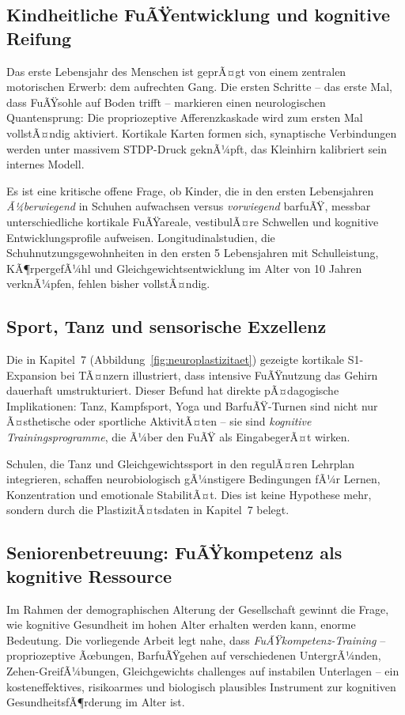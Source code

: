 ﻿\documentclass[12pt,a4paper]{report}
\theoremstyle{plain}
\theoremstyle{definition}
\theoremstyle{remark}
\begin{document}
\subsection{Kindheitliche FuÃŸentwicklung und kognitive Reifung}

Das erste Lebensjahr des Menschen ist geprÃ¤gt von einem
zentralen motorischen Erwerb: dem aufrechten Gang. Die ersten
Schritte -- das erste Mal, dass FuÃŸsohle auf Boden trifft --
markieren einen neurologischen Quantensprung: Die propriozeptive
Afferenzkaskade wird zum ersten Mal vollstÃ¤ndig aktiviert.
Kortikale Karten formen sich, synaptische Verbindungen werden
unter massivem STDP-Druck geknÃ¼pft, das Kleinhirn kalibriert
sein internes Modell.

Es ist eine kritische offene Frage, ob Kinder, die in den ersten
Lebensjahren \emph{Ã¼berwiegend} in Schuhen aufwachsen versus
\emph{vorwiegend} barfuÃŸ, messbar unterschiedliche kortikale
FuÃŸareale, vestibulÃ¤re Schwellen und kognitive Entwicklungsprofile
aufweisen. Longitudinalstudien, die Schuhnutzungsgewohnheiten
in den ersten 5 Lebensjahren mit Schulleistung, KÃ¶rpergefÃ¼hl und
Gleichgewichtsentwicklung im Alter von 10 Jahren verknÃ¼pfen,
fehlen bisher vollstÃ¤ndig.

\subsection{Sport, Tanz und sensorische Exzellenz}

Die in Kapitel~7 (Abbildung~\ref{fig:neuroplastizitaet}) gezeigte
kortikale S1-Expansion bei TÃ¤nzern illustriert, dass intensive
FuÃŸnutzung das Gehirn dauerhaft umstrukturiert. Dieser Befund hat
direkte pÃ¤dagogische Implikationen: Tanz, Kampfsport, Yoga und
BarfuÃŸ-Turnen sind nicht nur Ã¤sthetische oder sportliche
AktivitÃ¤ten -- sie sind \emph{kognitive Trainingsprogramme},
die Ã¼ber den FuÃŸ als EingabegerÃ¤t wirken.

Schulen, die Tanz und Gleichgewichtssport in den regulÃ¤ren
Lehrplan integrieren, schaffen neurobiologisch gÃ¼nstigere
Bedingungen fÃ¼r Lernen, Konzentration und emotionale StabilitÃ¤t.
Dies ist keine Hypothese mehr, sondern durch die PlastizitÃ¤tsdaten
in Kapitel~7 belegt.

\subsection{Seniorenbetreuung: FuÃŸkompetenz als kognitive Ressource}

Im Rahmen der demographischen Alterung der Gesellschaft gewinnt
die Frage, wie kognitive Gesundheit im hohen Alter erhalten werden
kann, enorme Bedeutung. Die vorliegende Arbeit legt nahe, dass
\emph{FuÃŸkompetenz-Training} -- propriozeptive Ãœbungen, BarfuÃŸgehen
auf verschiedenen UntergrÃ¼nden, Zehen-GreifÃ¼bungen, Gleichgewichts\-
challenges auf instabilen Unterlagen -- ein kosteneffektives,
risikoarmes und biologisch plausibles Instrument zur kognitiven
GesundheitsfÃ¶rderung im Alter ist.
\end{document}
